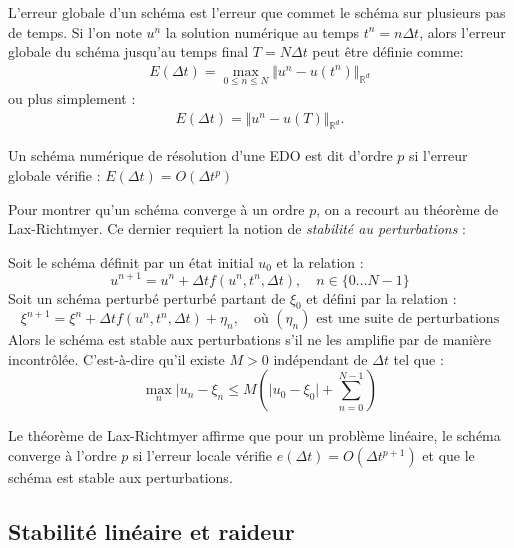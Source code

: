 \begin{definition}
    L'erreur globale d'un schéma est l'erreur que commet le schéma sur plusieurs pas de temps. 
    Si l'on note $u^n$ la solution numérique au temps $t^n = n \Delta t$, alors l'erreur globale du schéma jusqu'au temps final $T = N \Delta t$ peut être définie comme:
    \begin{align}
        E(\Delta t) = \max_{0\leq n \leq N} \Vert u^n - u(t^n) \Vert_{\mathbb{R}^d}
    \end{align}
    ou plus simplement :
    \begin{align}
        E(\Delta t)=\Vert u^n - u(T) \Vert_{\mathbb{R}^d}.
    \end{align}
\end{definition}

\begin{definition}
    Un schéma numérique de résolution d'une EDO est dit d'ordre $p$ si l'erreur globale vérifie : $E(\Delta t) = O(\Delta t^{p})$
\end{definition}
Pour montrer qu'un schéma converge à un ordre $p$, on a recourt au théorème de Lax-Richtmyer.
Ce dernier requiert la notion de \emph{stabilité au perturbations} : 
\begin{definition}
    Soit le schéma définit par un état initial $u_0$ et la relation : 
    $$u^{n+1} = u^n + \Delta t f(u^n,t^n,\Delta t),\quad n \in \{0 \dots N-1\}$$
    Soit un schéma perturbé perturbé partant de $\xi_0$ et défini par la relation : 
    $$\xi^{n+1} = \xi^n + \Delta t f(u^n,t^n,\Delta t) + \eta_n,\quad \text{où $(\eta_n)$ est une suite de perturbations}$$
    Alors le schéma est stable aux perturbations s'il ne les amplifie par de manière incontrôlée. C'est-à-dire qu'il existe $M>0$ indépendant de $\Delta t$ tel que :
    $$\max_{n} \vert u_n - \xi_n \leq M \left(\vert u_0 - \xi_0 \vert + \sum_{n=0}^{N-1}\right)$$
\end{definition}
\begin{theorem}
Le théorème de Lax-Richtmyer affirme que pour un problème linéaire, 
le schéma converge à l'ordre $p$ si l'erreur locale vérifie 
$e(\Delta t) = O(\Delta t^{p+1})$ et que le schéma est stable aux perturbations.
\end{theorem}



\subsection{Stabilité linéaire et raideur}\label{par:stabilite_edo}

